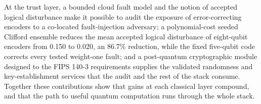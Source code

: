 \begin{ttuabstract}
At the trust layer, a bounded cloud fault model and the notion of accepted logical disturbance make it possible to audit the exposure of error-correcting encoders to a co-located fault-injection adversary; a polynomial-cost seeded Clifford ensemble reduces the mean accepted logical disturbance of eight-qubit encoders from 0.150 to 0.020, an 86.7\% reduction, while the fixed five-qubit code corrects every tested weight-one fault; and a post-quantum cryptographic module designed to the FIPS 140-3 requirements supplies the validated randomness and key-establishment services that the audit and the rest of the stack consume. Together these contributions show that gains at each classical layer compound, and that the path to useful quantum computation runs through the whole stack.
\end{ttuabstract}

